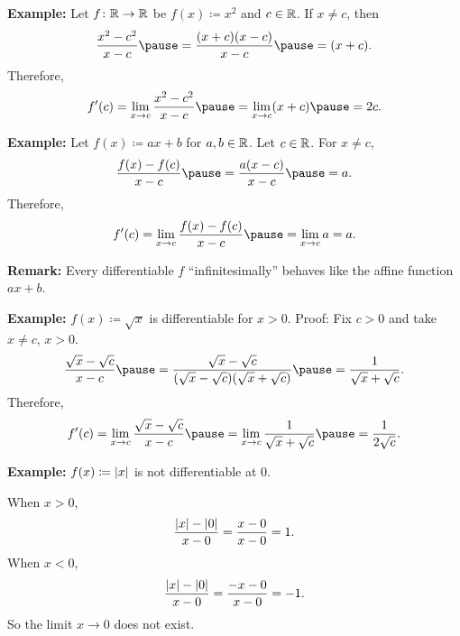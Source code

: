 \documentclass[10pt,aspectratio=169]{beamer}
\begin{document}
\begin{frame}
\textbf{Example:}
Let $f \colon {\mathbb{R}} \to {\mathbb{R}}$ be $f(x) \coloneqq x^2$ and $c \in {\mathbb{R}}$.
\pause
If $x \not= c$, then
\begin{equation*}
\frac{x^2-c^2}{x-c}
\pause
=
\frac{(x+c)(x-c)}{x-c}
\pause
=
(x+c) .
\end{equation*}
\pause
Therefore,
\begin{equation*}
f'(c)
= 
\lim_{x\to c} \frac{x^2-c^2}{x-c}
\pause
=
\lim_{x\to c} (x+c)
\pause
= 2c.
\end{equation*}

\pause
\medskip

\textbf{Example:}
Let $f(x) \coloneqq ax + b$ for $a, b \in {\mathbb{R}}$.
\pause
Let $c \in {\mathbb{R}}$.
\pause
For $x \not=c$,
\begin{equation*}
\frac{f(x)-f(c)}{x-c}
\pause
=
\frac{a(x-c)}{x-c}
\pause
= a .
\end{equation*}
\pause
Therefore,
\begin{equation*}
f'(c)
=
\lim_{x\to c} 
\frac{f(x)-f(c)}{x-c}
\pause
=
\lim_{x\to c} 
a
= a.
\end{equation*}

\pause

\textbf{Remark:}
Every differentiable $f$ ``infinitesimally'' behaves like
the affine function $ax + b$.

\end{frame}

\begin{frame}

\textbf{Example:}
$f(x) \coloneqq \sqrt{x}$ is differentiable for $x > 0$.
\pause
Proof:
Fix $c > 0$ and take $x \not= c$, $x > 0$.
\pause
\begin{equation*}
\frac{\sqrt{x}-\sqrt{c}}{x-c}
\pause
=
\frac{\sqrt{x}-\sqrt{c}}{(\sqrt{x}-\sqrt{c})(\sqrt{x}+\sqrt{c})}
\pause
=
\frac{1}{\sqrt{x}+\sqrt{c}} .
\end{equation*}
\pause
Therefore,
\begin{equation*}
f'(c)
=
\lim_{x\to c}
\frac{\sqrt{x}-\sqrt{c}}{x-c}
\pause
=
\lim_{x\to c}
\frac{1}{\sqrt{x}+\sqrt{c}}
\pause
=
\frac{1}{2\sqrt{c}} .
\end{equation*}

\pause
\medskip

\textbf{Example:}
$f(x) \coloneqq \left\lvert {x} \right\rvert$ is not differentiable at $0$.

\pause
When $x > 0$,
\begin{equation*}
\frac{\left\lvert {x} \right\rvert-\left\lvert {0} \right\rvert}{x-0} =
\frac{x-0}{x-0} = 1 .
\end{equation*}
\pause
When $x < 0$,
\begin{equation*}
\frac{\left\lvert {x} \right\rvert-\left\lvert {0} \right\rvert}{x-0} =
\frac{-x-0}{x-0} = -1 .
\end{equation*}
\pause
So the limit $x \to 0$ does not exist.

\end{frame}
\end{document}
